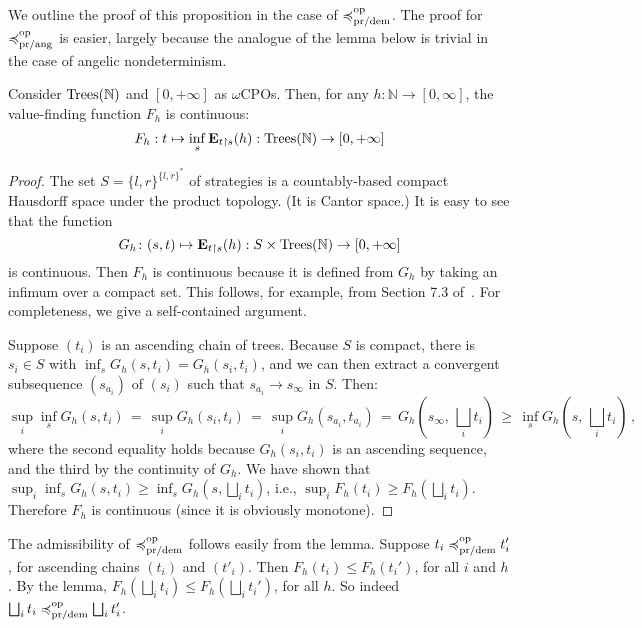 We outline the proof of this proposition in the case of $\preccurlyeq^{\text{op}}_{\text{pr/dem}}$. The proof for  $\preccurlyeq^{\text{op}}_{\text{pr/ang}}$ is easier, largely because the analogue of the lemma below is trivial in the case of angelic nondeterminism.
\begin{lemma} 
\label{lemma:F-continuous}
Consider $\textnormal{Trees}(\mathbb{N})$ and $[0,+\infty]$ as $\omega$CPOs. Then,
for any $h \colon \mathbb{N} \to [0,\infty]$, 
the value-finding function $F_h$ is continuous:
\[F_h : t \mapsto \inf_s  \mathbf{E}_{t\restriction s} (h) : \textnormal{Trees}(\mathbb{N}) \to [0,+\infty]\]
\end{lemma}
\begin{proof}
The set $S = \{l,r\}^{\{l,r\}^*}$ of strategies is a countably-based compact Hausdorff space under the product topology. (It is Cantor space.)
It is easy to see that  the function 
\[G_h \colon (s,t) \mapsto \mathbf{E}_{t\restriction s} (h) : S \times \textnormal{Trees}(\mathbb{N})  \to [0,+\infty] \]
is continuous.
Then $F_h$ is continuous because it is defined from $G_h$ by taking an infimum over a compact set. 
This follows, for example, from Section 7.3 of~\cite{AndreaShalk}. For completeness, we give a self-contained argument. 

Suppose $(t_i)$ is an ascending chain of trees.
Because $S$ is compact,  there is $s_i \in S$ with $\inf_s G_h(s,t_i) = G_h(s_i, t_i)$,
and we can then extract a convergent 
subsequence  $(s_{a_i})$ of $(s_i)$ such that $s_{a_i} \rightarrow s_\infty$ in $S$. Then:
\begin{equation*}
                \sup_i \inf_s G_h(s,t_i)
                \, =\, 
                \sup_i G_h(s_i, t_i)
                \, = \,
                \sup_i G_h(s_{a_i}, t_{a_i})
                \, = \,
                G_h(s_\infty, \, \bigsqcup_i t_i)
                \, \geq \,
                \inf_s  G_h(s, \, \bigsqcup_i t_i)\, ,
            \end{equation*}
where the second equality holds because $G_h(s_i, t_i)$ is an ascending sequence, and the third by the continuity of  $G_h$.
We have shown that $ \sup_i  \inf_s G_h(s,t_i) \geq \inf_s  G_h(s, \bigsqcup_i t_i)$, i.e., 
$ \sup_i  F_h(t_i) \geq F_h(\bigsqcup_i t_i)$. 
Therefore $F_h$ is continuous (since it is obviously monotone).
\end{proof}

\noindent
The admissibility of $\preccurlyeq^{\text{op}}_{\text{pr/dem}}$ follows easily from the lemma.
Suppose $t_i \preccurlyeq^{\text{op}}_{\text{pr/dem}} t_i'$, for ascending chains $(t_i)$ and $(t'_i)$.
Then $F_h(t_i) \leq F_h (t_i')$, for all $i$ and $h$. By the lemma, 
 $F_h (\bigsqcup_i t_i) \leq F_h (\bigsqcup_i t_i')$, for all $h$.
So indeed  $\bigsqcup_i t_i \preccurlyeq^{\text{op}}_{\text{pr/dem}} \bigsqcup_i t_i'$.

